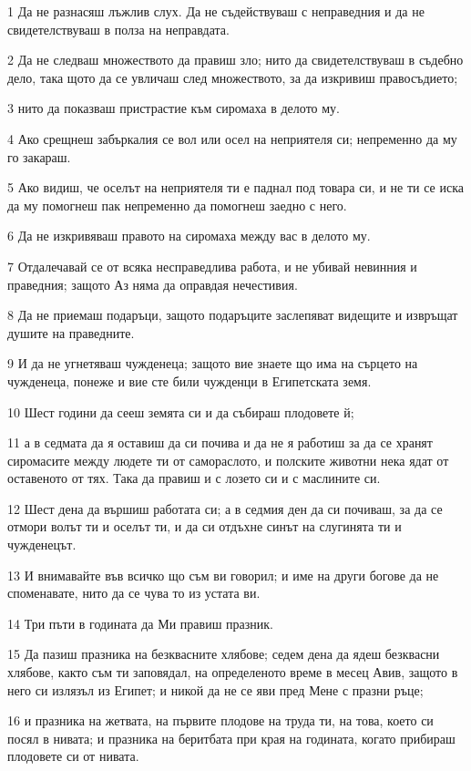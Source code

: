 \par 1 Да не разнасяш лъжлив слух. Да не съдействуваш с неправедния и да не свидетелствуваш в полза на неправдата.
\par 2 Да не следваш множеството да правиш зло; нито да свидетелствуваш в съдебно дело, така щото да се увличаш след множеството, за да изкривиш правосъдието;
\par 3 нито да показваш пристрастие към сиромаха в делото му.
\par 4 Ако срещнеш забъркалия се вол или осел на неприятеля си; непременно да му го закараш.
\par 5 Ако видиш, че оселът на неприятеля ти е паднал под товара си, и не ти се иска да му помогнеш пак непременно да помогнеш заедно с него.
\par 6 Да не изкривяваш правото на сиромаха между вас в делото му.
\par 7 Отдалечавай се от всяка несправедлива работа, и не убивай невинния и праведния; защото Аз няма да оправдая нечестивия.
\par 8 Да не приемаш подаръци, защото подаръците заслепяват видещите и извръщат душите на праведните.
\par 9 И да не угнетяваш чужденеца; защото вие знаете що има на сърцето на чужденеца, понеже и вие сте били чужденци в Египетската земя.
\par 10 Шест години да сееш земята си и да събираш плодовете й;
\par 11 а в седмата да я оставиш да си почива и да не я работиш за да се хранят сиромасите между людете ти от самораслото, и полските животни нека ядат от оставеното от тях. Така да правиш и с лозето си и с маслините си.
\par 12 Шест дена да вършиш работата си; а в седмия ден да си почиваш, за да се отмори волът ти и оселът ти, и да си отдъхне синът на слугинята ти и чужденецът.
\par 13 И внимавайте във всичко що съм ви говорил; и име на други богове да не споменавате, нито да се чува то из устата ви.
\par 14 Три пъти в годината да Ми правиш празник.
\par 15 Да пазиш празника на безквасните хлябове; седем дена да ядеш безквасни хлябове, както съм ти заповядал, на определеното време в месец Авив, защото в него си излязъл из Египет; и никой да не се яви пред Мене с празни ръце;
\par 16 и празника на жетвата, на първите плодове на труда ти, на това, което си посял в нивата; и празника на беритбата при края на годината, когато прибираш плодовете си от нивата.
